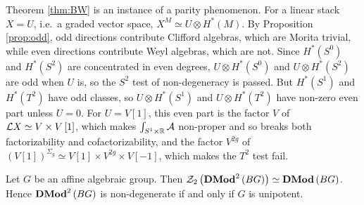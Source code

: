 Theorem \ref{thm:BW} is an instance of a parity phenomenon. For a linear
stack $X=U$, i.e.\ a graded vector space, $X^M\simeq U\otimes H^*\left(M\right)$. By
Proposition \ref{prop:odd}, odd directions contribute Clifford algebras, which are Morita trivial,
while even directions contribute Weyl algebras, which are not. Since $H^*\left(S^0\right)$ and
$H^*\left(S^2\right)$ are concentrated in even degrees, $U\otimes H^*\left(S^0\right)$ and
$U\otimes H^*\left(S^2\right)$ are odd when $U$ is, so the $S^2$ test of non-degeneracy is passed.
But $H^*\left(S^1\right)$ and $H^*\left(T^2\right)$ have odd classes, so $U\otimes H^*\left(S^1\right)$
and $U\otimes H^*\left(T^2\right)$ have non-zero even part unless $U=0$. For $U=V\left[1\right]$,
this even part is the factor $V$ of $\mathcal{L} X\simeq V\times V\left[1\right]$, which makes
$\int_{S^1\times\mathbb{R}}\mathcal{A}$ non-proper and so breaks both factorizability and cofactorizability, and
the factor $V^{2g}$ of
$\left(V\left[1\right]\right)^{\Sigma_g}\simeq V\left[1\right]\times V^{2g}\times V\left[-1\right]$,
which makes the $T^2$ test fail.

\begin{prop}
\label{prop:BG}
Let $G$ be an affine algebraic group. Then
$\mathcal{Z}_2\left(\mathbf{DMod}^2\left(BG\right)\right)\simeq\mathbf{DMod}\left(BG\right)$. Hence
$\mathbf{DMod}^2\left(BG\right)$ is non-degenerate if and only if $G$ is unipotent.
\end{prop}

